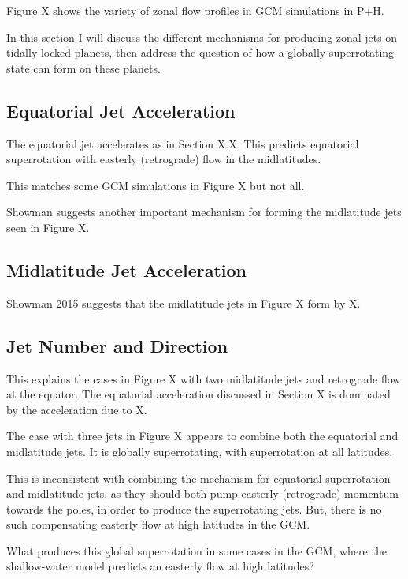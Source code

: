 Figure X shows the variety of zonal flow profiles in GCM simulations in P+H.

In this section I will discuss the different mechanisms for producing zonal jets on tidally locked planets, then address the question of how a globally superrotating state can form on these planets.

\subsection*{Equatorial Jet Acceleration}

The equatorial jet accelerates as in Section X.X. This predicts equatorial superrotation with easterly (retrograde) flow in the midlatitudes.

This matches some GCM simulations in Figure X but not all.

Showman suggests another important mechanism for forming the midlatitude jets seen in Figure X.

\subsection*{Midlatitude Jet Acceleration}

Showman 2015 suggests that the midlatitude jets in Figure X form by X.


\subsection*{Jet Number and Direction}

This explains the cases in Figure X with two midlatitude jets and retrograde flow at the equator. The equatorial acceleration discussed in Section X is dominated by the acceleration due to X.

The case with three jets in Figure X appears to combine both the equatorial and midlatitude jets. It is globally superrotating, with superrotation at all latitudes.

This is inconsistent with combining the mechanism for equatorial superrotation and midlatitude jets, as they should both pump easterly (retrograde) momentum towards the poles, in order to produce the superrotating jets. But, there is no such compensating easterly flow at high latitudes in the GCM.

What produces this global superrotation in some cases in the GCM, where the shallow-water model predicts an easterly flow at high latitudes?

